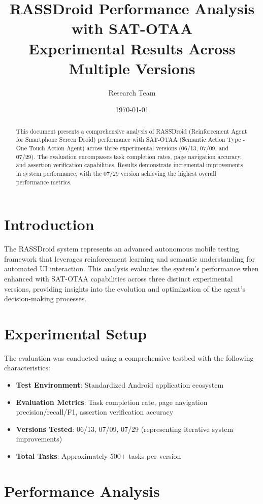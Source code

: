 \documentclass[11pt]{article}
\title{\Large \textbf{RASSDroid Performance Analysis with SAT-OTAA}\\ 
       \large Experimental Results Across Multiple Versions}
\author{Research Team}
\date{\today}
\begin{document}
\maketitle

\begin{abstract}
This document presents a comprehensive analysis of RASSDroid (Reinforcement Agent for Smartphone Screen Droid) performance with SAT-OTAA (Semantic Action Type - One Touch Action Agent) across three experimental versions (06/13, 07/09, and 07/29). The evaluation encompasses task completion rates, page navigation accuracy, and assertion verification capabilities. Results demonstrate incremental improvements in system performance, with the 07/29 version achieving the highest overall performance metrics.
\end{abstract}

\section{Introduction}

The RASSDroid system represents an advanced autonomous mobile testing framework that leverages reinforcement learning and semantic understanding for automated UI interaction. This analysis evaluates the system's performance when enhanced with SAT-OTAA capabilities across three distinct experimental versions, providing insights into the evolution and optimization of the agent's decision-making processes.

\section{Experimental Setup}

The evaluation was conducted using a comprehensive testbed with the following characteristics:
\begin{itemize}
    \item \textbf{Test Environment}: Standardized Android application ecosystem
    \item \textbf{Evaluation Metrics}: Task completion rate, page navigation precision/recall/F1, assertion verification accuracy
    \item \textbf{Versions Tested}: 06/13, 07/09, 07/29 (representing iterative system improvements)
    \item \textbf{Total Tasks}: Approximately 500+ tasks per version
\end{itemize}

\section{Performance Analysis}
\end{document}
